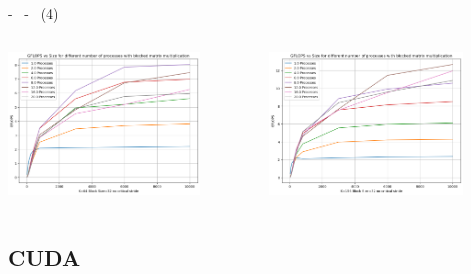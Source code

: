 \documentclass[compress]{beamer}
\begin{document}
\begin{frame}{\secname \text{ }- \subsecname\ \text{ }- \subsubsecname\ (4)}
\begin{columns}
\begin{minipage}{1\textwidth}
                \centering
                \begin{adjustbox}{margin=0cm 0cm 0cm 0cm, center} %
                    \includegraphics[width=0.8\textwidth, frame]{resources/rect_k64_blocked_nocrit.png}
                \end{adjustbox}
                \begin{adjustbox}{margin=0cm 0cm 0cm 0.1cm, center} %
                    \includegraphics[width=0.8\textwidth, frame]{resources/rect_k156_blocked_nocrit.png}
                \end{adjustbox}
            \end{minipage}
    \end{columns}
\end{frame}

\subsection{CUDA}
\end{document}
